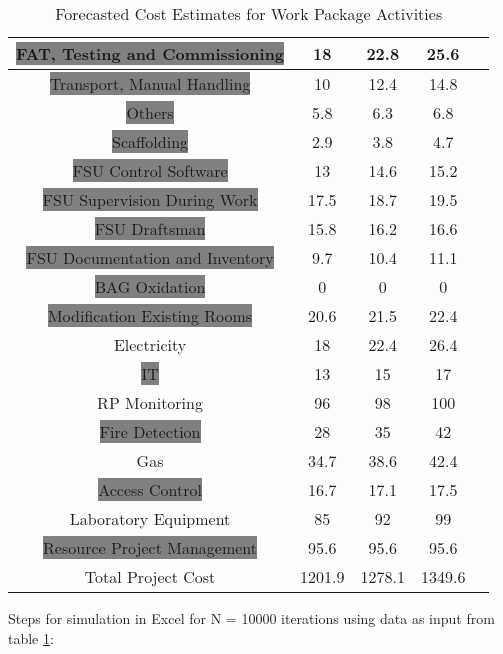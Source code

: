 \begin{table}[ht]
\begin{center}
\begin{tabular}{ |c|c|c|c|c|}
		\hline
		\colorbox{Gray}{FAT, Testing and Commissioning }		&18   							& 	22.8				&25.6\\
		\hline
		\colorbox{Gray}{Transport, Manual Handling }	&10   & 12.4	&14.8\\
		\hline
		\colorbox{Gray}{Others}			&5.8   		& 	6.3			&6.8\\
		\hline
		\colorbox{Gray}{Scaffolding}		&2.9   							& 	3.8				& 4.7\\
		\hline
		\colorbox{Gray}{FSU Control Software}		&13   							& 		14.6			&15.2\\
		\hline
		\colorbox{Gray}{FSU Supervision During Work}	&17.5   		& 		18.7			&19.5\\
		\hline
		\colorbox{Gray}{FSU Draftsman}		&15.8   			& 	16.2				&16.6\\
		\hline
		\colorbox{Gray}{FSU Documentation and Inventory}	&9.7  							& 			10.4		&11.1\\
		\hline
		\colorbox{Gray}{BAG Oxidation}										&0   							& 	0				&0\\
		\hline
		\colorbox{Gray}{Modification Existing Rooms}	&20.6  							& 		21.5			&22.4\\
		\hline
		\colorbox{Melon}{Electricity}		&18   							& 	22.4				&26.4\\
		\hline
		\colorbox{Gray}{IT}		&13   							& 	15				&17\\
		\hline
		\colorbox{Melon}{RP Monitoring}		&96  							& 	98				&100\\
		\hline
		\colorbox{Gray}{Fire Detection}			&28  							& 	35				&42\\
		\hline
		\colorbox{Melon}{Gas }		&34.7					& 			38.6		&42.4\\
		\hline
		\colorbox{Gray}{Access Control}			&16.7						& 	17.1					&17.5   \\
		\hline
		\colorbox{Melon}{Laboratory Equipment}			&85   							& 	92				&99\\
		\hline
		\colorbox{Gray}{Resource Project Management}			&95.6  							& 	95.6				&95.6\\
		\hline
		Total Project 	Cost								&1201.9							& 1278.1					&1349.6\\
		\hline
	\end{tabular}
\end{center}
\caption[Forecasted Cost Estimates for Work Package Activities]{Forecasted Cost Estimates for Work Package Activities}
\label{tab:caption2}
\end{table}%

Steps for simulation in Excel for N = 10000 iterations using data as input from table \ref{tab:caption2}:

